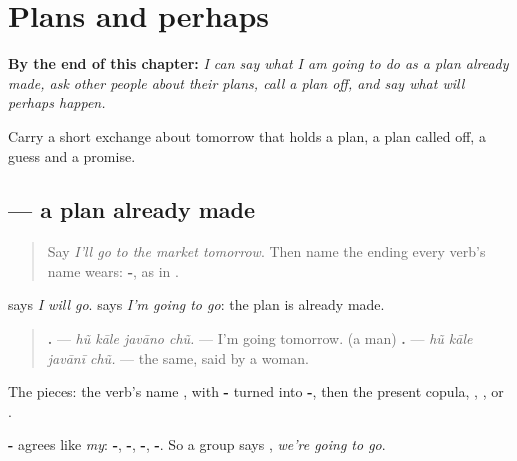 
\chapter{Plans and perhaps}
\label{ch:gu-plans-and-perhaps}

\begin{chapteropening}
\textbf{By the end of this chapter:} \emph{I can say what I am going to do as a plan already made, ask other people about their plans, call a plan off, and say what will perhaps happen.}

Carry a short exchange about tomorrow that holds a plan, a plan called off, a guess and a promise.
\end{chapteropening}

\section[\texorpdfstring{…\gu{વાનો} \gu{છું} (-vāno chũ)}{…વાનો છું (-vāno chũ)}]{   — a plan already made}

\label{lesson:GU-C150-javano}



\begin{quote}
Say \emph{I'll go to the market tomorrow}. Then name the ending every verb's name wears: \textbf{-}, as in \textbf{}.
\end{quote}

\begin{grammarlens}[title={Grammar Lens: -\gu{વાનો} and the copula}]
\textbf{ } says \emph{I will go}. \textbf{  } says \emph{I'm going to go}: the plan is already made.

\begin{quote}
\textbf{   .} — \emph{hũ kāle javāno chũ.} — I'm going tomorrow. (a man) \textbf{   .} — \emph{hũ kāle javānī chũ.} — the same, said by a woman.
\end{quote}

The pieces: the verb's name \textbf{}, with \textbf{-} turned into \textbf{-}, then the present copula, \textbf{}, \textbf{}, \textbf{} or \textbf{}.

\textbf{-} agrees like \emph{my}: \textbf{-}, \textbf{-}, \textbf{-}, \textbf{-}. So a group says \textbf{  }, \emph{we're going to go}.
\end{grammarlens}


